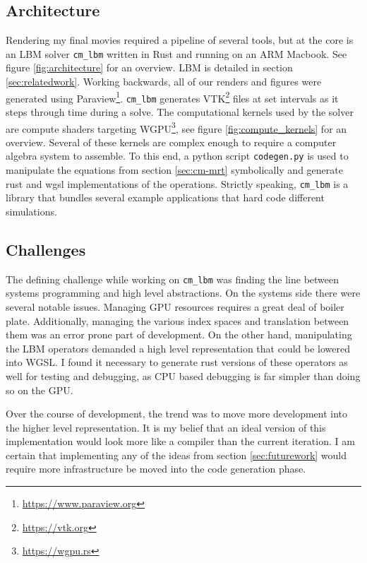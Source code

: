 \subsection{Architecture}\label{sec:architecture}

Rendering my final movies required a pipeline of several tools,
but at the core is an LBM solver \lstinline{cm_lbm} written in Rust 
and running on an ARM Macbook.
See figure \ref{fig:architecture} for an overview.
LBM is detailed in section \ref{sec:relatedwork}. 
Working backwards, all of our renders
and figures were generated using 
Paraview\footnote{\url{https://www.paraview.org}}.
\lstinline{cm_lbm} generates 
VTK\footnote{\url{https://vtk.org}} files at set intervals as it 
steps through time during a solve.
The computational kernels used by the solver are 
compute shaders targeting WGPU\footnote{\url{https://wgpu.rs}},
see figure \ref{fig:compute_kernels} for an overview.
Several of these kernels are complex enough
to require a computer algebra system to assemble.
To this end, a python script \lstinline{codegen.py}
is used to manipulate the equations from section \ref{sec:cm-mrt}
symbolically and generate
rust and wgsl implementations of the operations.
Strictly speaking, \lstinline{cm_lbm} is a library 
that bundles several example applications 
that hard code different simulations.

\subsection{Challenges}
The defining challenge while working on \lstinline{cm_lbm} was finding
the line between systems programming and high level abstractions.
On the systems side there were several notable issues.
Managing GPU resources requires a great deal of boiler plate.
Additionally, managing the various index spaces and translation
between them was an error prone part of development.
On the other hand, manipulating the LBM operators
demanded a high level representation that could be lowered
into WGSL.
I found it necessary to generate rust versions of these
operators as well for testing and debugging, as 
CPU based debugging is far simpler than doing so on the GPU.

Over the course of development, the trend was to move
more development into the higher level representation.
It is my belief that an ideal version of this implementation would
look more like a compiler than the current iteration.
I am certain that implementing any of the ideas from 
section \ref{sec:futurework}
would require more infrastructure be moved into the 
code generation phase.

